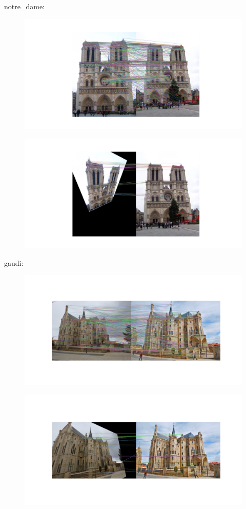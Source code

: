 \documentclass[11pt]{article}
\begin{document}
notre\_dame:
\begin{figure}[H]
    \centering
    \includegraphics[width=14cm]{images/part3/orb_image_2_0.png}
\end{figure}
\begin{figure}[H]
    \centering
    \includegraphics[width=14cm]{images/part3/orb_image_2_1.png}
\end{figure}

gaudi:
\begin{figure}[H]
    \centering
    \includegraphics[width=14cm]{images/part3/orb_image_3_0.png}
\end{figure}
\begin{figure}[H]
    \centering
    \includegraphics[width=14cm]{images/part3/orb_image_3_1.png}
\end{figure}
\end{document}
